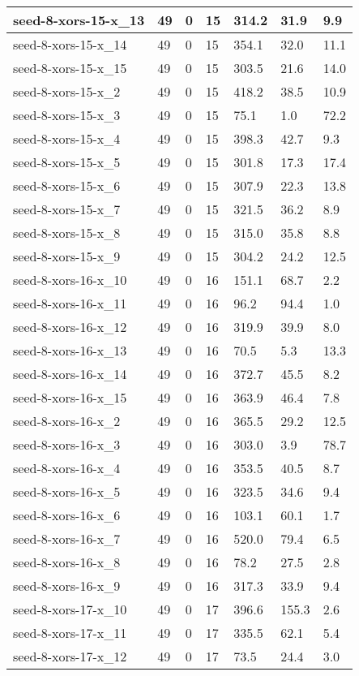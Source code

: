 \begin{scriptsize}
\begin{longtable}{|p{5cm}|l|l|l|l|l|l|}
seed-8-xors-15-x\_13&49&0&15&314.2&31.9&9.9 \\ \hline 
seed-8-xors-15-x\_14&49&0&15&354.1&32.0&11.1 \\ \hline 
seed-8-xors-15-x\_15&49&0&15&303.5&21.6&14.0 \\ \hline 
seed-8-xors-15-x\_2&49&0&15&418.2&38.5&10.9 \\ \hline 
seed-8-xors-15-x\_3&49&0&15&75.1&1.0&72.2 \\ \hline 
seed-8-xors-15-x\_4&49&0&15&398.3&42.7&9.3 \\ \hline 
seed-8-xors-15-x\_5&49&0&15&301.8&17.3&17.4 \\ \hline 
seed-8-xors-15-x\_6&49&0&15&307.9&22.3&13.8 \\ \hline 
seed-8-xors-15-x\_7&49&0&15&321.5&36.2&8.9 \\ \hline 
seed-8-xors-15-x\_8&49&0&15&315.0&35.8&8.8 \\ \hline 
seed-8-xors-15-x\_9&49&0&15&304.2&24.2&12.5 \\ \hline 
seed-8-xors-16-x\_10&49&0&16&151.1&68.7&2.2 \\ \hline 
seed-8-xors-16-x\_11&49&0&16&96.2&94.4&1.0 \\ \hline 
seed-8-xors-16-x\_12&49&0&16&319.9&39.9&8.0 \\ \hline 
seed-8-xors-16-x\_13&49&0&16&70.5&5.3&13.3 \\ \hline 
seed-8-xors-16-x\_14&49&0&16&372.7&45.5&8.2 \\ \hline 
seed-8-xors-16-x\_15&49&0&16&363.9&46.4&7.8 \\ \hline 
seed-8-xors-16-x\_2&49&0&16&365.5&29.2&12.5 \\ \hline 
seed-8-xors-16-x\_3&49&0&16&303.0&3.9&78.7 \\ \hline 
seed-8-xors-16-x\_4&49&0&16&353.5&40.5&8.7 \\ \hline 
seed-8-xors-16-x\_5&49&0&16&323.5&34.6&9.4 \\ \hline 
seed-8-xors-16-x\_6&49&0&16&103.1&60.1&1.7 \\ \hline 
seed-8-xors-16-x\_7&49&0&16&520.0&79.4&6.5 \\ \hline 
seed-8-xors-16-x\_8&49&0&16&78.2&27.5&2.8 \\ \hline 
seed-8-xors-16-x\_9&49&0&16&317.3&33.9&9.4 \\ \hline 
seed-8-xors-17-x\_10&49&0&17&396.6&155.3&2.6 \\ \hline 
seed-8-xors-17-x\_11&49&0&17&335.5&62.1&5.4 \\ \hline 
seed-8-xors-17-x\_12&49&0&17&73.5&24.4&3.0 \\ \hline 

\end{longtable}
\end{scriptsize}
